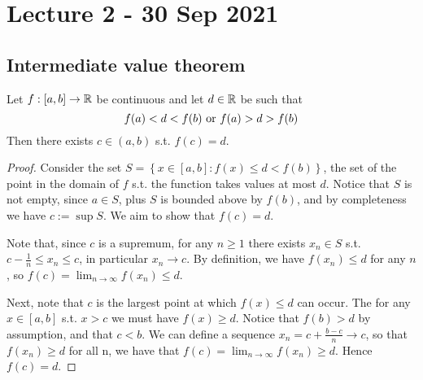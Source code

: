 \section{Lecture 2 - 30 Sep 2021}
\subsection{Intermediate value theorem}
\begin{theorem}
  Let $f:[a,b]\to\mathbb R$ be continuous and let $d\in\mathbb R$ be such that
  \[f(a)<d<f(b) \textrm{ or } f(a)>d>f(b)\]
  Then there exists $c\in(a,b)$ s.t. $f(c)=d$.
  \label{ivt}
\end{theorem}
\begin{proof}
  Consider the set $S=\left\{ x\in [a,b] :f(x)\leq d <f(b)\right\}$, the set of the point
  in the domain of $f$ s.t. the function takes values at most $d$.
  Notice that $S$ is not empty, since $a\in S$, plus $S$ is bounded above by $f(b)$, and
  by completeness we have $c:=\sup S$. We
  aim to show that $f(c)=d$. 

  Note that, since $c$ is a supremum, for any $n\geq 1$ there exists $x_n\in S$ s.t.
  $c-\frac{1}{n}\leq x_n\leq c$, in particular $x_n\to c$. By definition, we have
  $f(x_n)\leq d$ for any $n$, so $f(c)=\lim_{n\to\infty} f(x_n)\leq d$.

  Next, note that $c$ is the largest point at which $f(x)\leq d$ can occur. The for any
  $x\in [a,b]$ s.t. $x>c$ we must have $f(x)\geq d$. Notice that $f(b)>d$ by assumption,
  and that $c< b$. We can define a sequence $x_n=c+\frac{b-c}{n}\to c$, so that
  $f(x_n)\geq d$ for all n, we have that $f(c)=\lim_{n\to\infty} f(x_n)\geq d$. Hence
  $f(c)=d$.
\end{proof}


